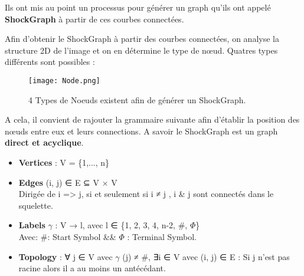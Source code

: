 Ils ont mis au point un processus pour générer un graph qu'ils ont appelé \textbf{ShockGraph} à partir de ces courbes connectées.

Afin d'obtenir le ShockGraph à partir des courbes connectées, on analyse la structure 2D de l'image et on en détermine le type de nœud. Quatres types différents sont possibles :

\begin{figure}[H]
    \centering
    \texttt{[image: Node.png]}
	\caption{4 Types de Noeuds existent afin de générer un ShockGraph.}\label{image.skel} 
\end{figure}

A cela, il convient de rajouter la grammaire suivante afin d'établir la position des nœuds entre eux et leurs connections. A savoir le ShockGraph est un graph \textbf{direct et acyclique}.\\


\begin{itemize}
	\item \textbf{Vertices} : V = \{1,..., n\} \\
	
	\item \textbf{Edges} (i, j) ∈ E ⊆ V × V \\
	Dirigée de i => j, si et seulement si i ≠ j , i \& j sont connectés dans le squelette.\\
	
	\item \textbf{Labels} $\gamma$ : V → l, avec l ∈ \{1, 2, 3, 4, n-2, \#, $\Phi$\}\\
	Avec: \#: Start Symbol \&\& $\Phi$ : Terminal Symbol.\\
	
	\item \textbf{Topology} : ∀ j ∈ V avec $\gamma$ (j) ≠ \#, ∃i ∈ V avec (i, j) ∈ E : Si j n’est pas racine alors il a au moins un antécédant.

\end{itemize}

\clearpage